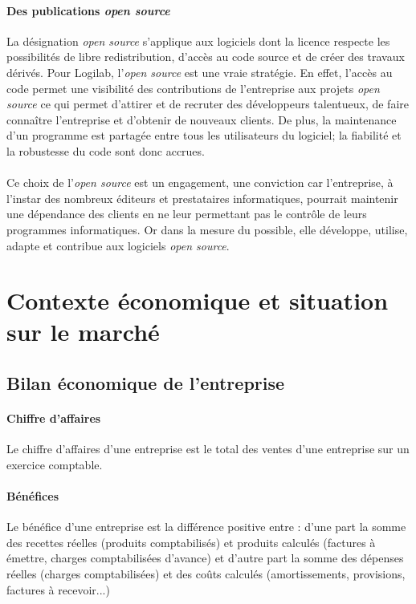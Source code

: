 \documentclass {report}
\begin{document}
\paragraph{Des publications \textit{open source}}
La désignation \textit{open source} s'applique aux logiciels dont la licence respecte les possibilités de libre redistribution, d'accès au code source et de créer des travaux dérivés. Pour Logilab, l'\textit{open source} est une vraie stratégie. En effet, l'accès au code permet une visibilité des contributions de l'entreprise aux projets \textit{open source} ce qui permet d'attirer et de recruter des développeurs talentueux, de faire connaître l'entreprise et d'obtenir de nouveaux clients. De plus, la maintenance d'un programme est partagée entre tous les utilisateurs du logiciel; la fiabilité et la robustesse du code sont donc accrues.

\paragraph{}
Ce choix de l'\textit{open source} est un engagement, une conviction car l'entreprise, à l'instar des nombreux éditeurs et prestataires informatiques, pourrait maintenir une dépendance des clients en ne leur permettant pas le contrôle de leurs programmes informatiques. Or dans la mesure du possible, elle développe, utilise, adapte et contribue aux logiciels \textit{open source}.





\section{Contexte économique et situation sur le marché}
\subsection{Bilan économique de l'entreprise}

\paragraph{Chiffre d'affaires}
Le chiffre d'affaires d'une entreprise est le total des ventes d'une entreprise sur un exercice comptable.
    
\paragraph{Bénéfices}
Le bénéfice d'une entreprise est la différence positive entre : d'une part la somme des recettes réelles (produits comptabilisés) et produits calculés (factures à émettre, charges comptabilisées d'avance) et d'autre part la somme des dépenses réelles (charges comptabilisées) et des coûts calculés (amortissements, provisions, factures à recevoir...)
\end{document}
